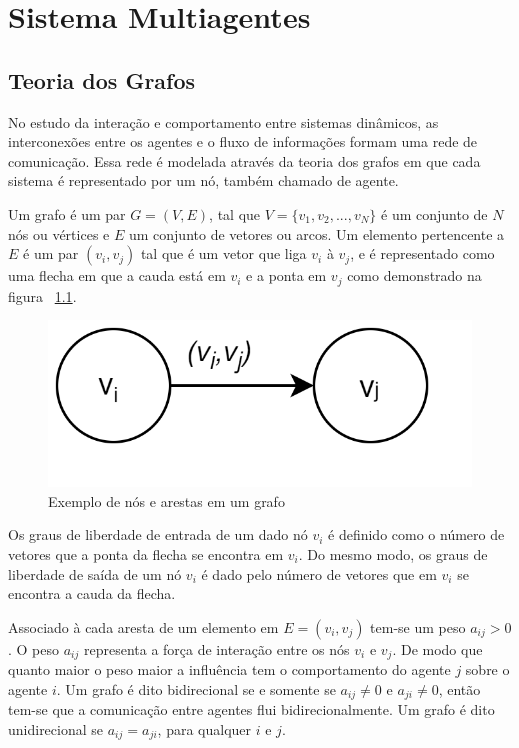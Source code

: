 \chapter{Sistema Multiagentes}
\label{chap:multiagentes}

\section{Teoria dos Grafos}
No estudo da interação e comportamento entre sistemas dinâmicos, as interconexões entre os agentes e o fluxo de informações formam uma rede de comunicação. Essa rede é modelada através da teoria dos grafos em que cada sistema é representado por um nó, também chamado de agente.

Um grafo é um par $G = (V, E)$, tal que $V = \{v_{1},v_{2}, ...,v_{N}\}$ é um conjunto de $N$ nós ou vértices e $E$ um conjunto de vetores ou arcos. Um elemento pertencente a $E$ é um par $(v_{i}, v_{j})$ tal que é um vetor que liga $v_{i}$ à $v_{j}$, e é representado como uma flecha em que a cauda está em $v_{i}$ e a ponta em $v_{j}$ como demonstrado na figura ~\ref{fig:nos_arestas_grafos}. 

\begin{figure}[hb]
    \centering
    \includegraphics[scale=0.3]{figures/Multiagente/ex_grafo2.png}
    \caption{Exemplo de nós e arestas em um grafo}
    \label{fig:nos_arestas_grafos}
\end{figure}

Os graus de liberdade de entrada de um dado nó $v_i$ é definido como o número de vetores que a ponta da flecha se encontra em $v_i$. Do mesmo modo, os graus de liberdade de saída de um nó $v_i$ é dado pelo número de vetores que em $v_i$ se encontra a cauda da flecha.

Associado à cada aresta de um elemento em $E = (v_i, v_j)$ tem-se um peso $a_{ij} > 0$. O peso $a_{ij}$ representa a força de interação entre os nós $v_i$ e $v_j$. De modo que quanto maior o peso maior a influência tem o comportamento do agente $j$ sobre o agente $i$.
Um grafo é dito bidirecional se e somente se $a_{ij} \neq 0$ e $a_{ji} \neq 0$, então tem-se que a comunicação entre agentes flui bidirecionalmente. Um grafo é dito unidirecional se $a_{ij} = a_{ji}$, para qualquer $i$ e $j$.


